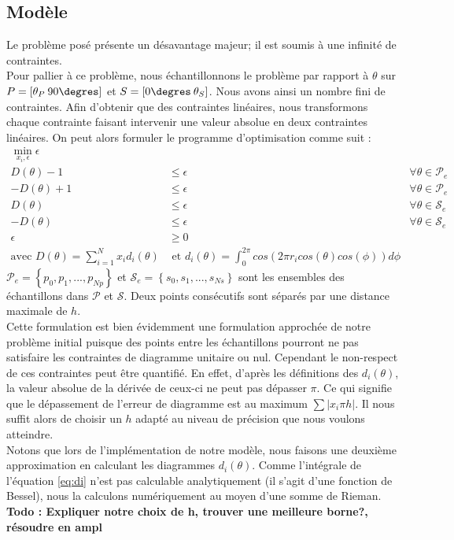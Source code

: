 \subsection{Modèle}
Le problème posé présente un désavantage majeur; il est soumis à une infinité de contraintes.\\
Pour pallier à ce problème, nous échantillonnons le problème par rapport à $\theta$ sur $P = [\theta_P\: 90\degres  ]$ et $S = [0\degres \:\theta_S]$. Nous avons ainsi un nombre fini de contraintes. Afin d'obtenir que des contraintes linéaires, nous transformons chaque contrainte faisant intervenir une valeur absolue en deux contraintes linéaires. On peut alors formuler le programme d'optimisation comme suit :
\begin{align}
\min_{x_i,\epsilon} \epsilon & \\
 D(\theta)-1 &\leq \epsilon & \forall \theta\in \mathcal{P}_e \\
 -D(\theta)+1&\leq \epsilon & \forall \theta\in \mathcal{P}_e\\
 D(\theta) &\leq \epsilon & \forall \theta\in \mathcal{S}_e\\
 -D(\theta) &\leq \epsilon &\forall \theta\in \mathcal{S}_e\\
 \epsilon &\geq 0\\
\text{avec } D(\theta) = \sum_{i=1}^N x_i d_i(\theta) & \text{ et } d_i(\theta) = \int_0^{2 \pi} cos(2 \pi r_i cos(\theta)cos(\phi)) d\phi \label{eq:di} &
\end{align}
$\mathcal{P}_e = \left\lbrace p_0,p_1,...,p_{Np}\right\rbrace$ et $\mathcal{S}_e= \left\lbrace s_0,s_1,...,s_{Ns}\right\rbrace$ sont les ensembles des échantillons dans $\mathcal{P}$ et $\mathcal{S}$. Deux points consécutifs sont séparés par une distance maximale de $h$.\\
Cette formulation est bien évidemment une formulation approchée de notre problème initial puisque des points entre les échantillons pourront ne pas satisfaire les contraintes de diagramme unitaire ou nul. Cependant le non-respect de ces contraintes peut être quantifié. En effet, d'après les définitions des $d_i(\theta)$, la valeur absolue de la dérivée de ceux-ci ne peut pas dépasser $\pi$. Ce qui signifie que le dépassement de l'erreur de diagramme est au maximum $\sum |x_i\pi h|$. Il nous suffit alors de choisir un $h$ adapté au niveau de précision que nous voulons atteindre. 
\\
Notons que lors de l'implémentation de notre modèle, nous faisons une deuxième approximation en calculant les diagrammes $d_i(\theta)$. Comme l'intégrale de l'équation \eqref{eq:di} n'est pas calculable analytiquement (il s'agit d'une fonction de Bessel), nous la calculons numériquement au moyen d'une somme de Rieman.
\textbf{Todo : Expliquer notre choix de h, trouver une meilleure borne?, résoudre en ampl}		\\


